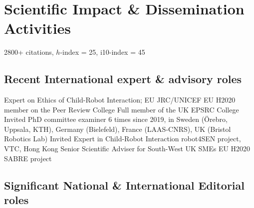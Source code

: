 \documentclass[10pt,a4paper]{moderncv}        %
\begin{document}
\section{Scientific Impact \& Dissemination Activities}

 {} {} {}
\vspace{0.2em} {2800+ citations, $h$-index = 25, i10-index = 45 } {} {} {}

\subsection{Recent International expert \& advisory roles}

 {Expert on Ethics of Child-Robot Interaction; EU JRC/UNICEF} {} {} {} {}
 {EU H2020 member on the Peer Review College} {} {} {} {}
 {Full member of the UK EPSRC College} {} {} {} {}
 {Invited PhD committee examiner} {6 times since 2019, in Sweden
(Örebro, Uppsala, KTH), Germany (Bielefeld), France (LAAS-CNRS), UK (Bristol
Robotics Lab)} {} {} {}
 {Invited Expert in Child-Robot Interaction} {robot4SEN project, VTC, Hong Kong} {} {} {}
 {Senior Scientific Adviser for South-West UK SMEs} {EU H2020 SABRE project} {} {} {} {}

\subsection{Significant National \& International Editorial roles}
 {} {} {}
 {} {} {}
 {} {} {}
 {} {} {}
\end{document}
